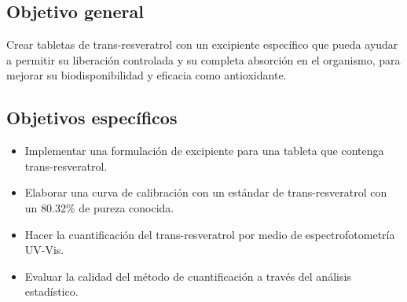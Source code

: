 \subsection{Objetivo general}
Crear tabletas de trans-resveratrol con un excipiente específico que pueda ayudar a permitir
 su liberación controlada y su completa absorción en el organismo, para mejorar
 su biodisponibilidad y eficacia como antioxidante.

\subsection{Objetivos específicos}
\begin{itemize}
    \item Implementar una formulación de excipiente para una tableta que contenga trans-resveratrol.
    \item Elaborar una curva de calibración con un estándar de trans-resveratrol con un \num{80.32}\% de
    pureza conocida.
    \item Hacer la cuantificación del trans-resveratrol por medio de espectrofotometría UV-Vis.
    \item Evaluar la calidad del método de cuantificación a través del análisis estadístico.
\end{itemize}